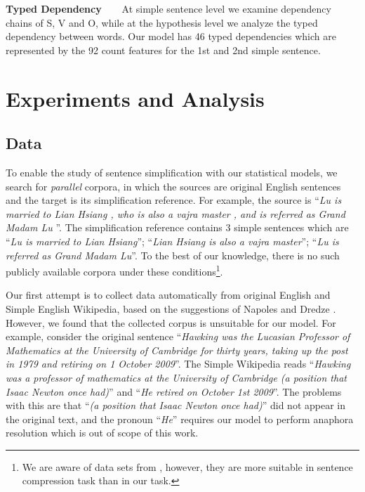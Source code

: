 \documentclass[10pt]{article}
\begin{document}
\textbf{Typed Dependency\ \ \ } At simple sentence level we examine dependency chains of S, V and O, while at the hypothesis level we analyze the typed dependency between words.
Our model has 46 typed dependencies which are represented by the 92 count features for the 1st and 2nd simple sentence.

\section{Experiments and Analysis}
\label{sec:Experiments}

\subsection{Data}

To enable the study of sentence simplification with our statistical models, we search for \textit{parallel} corpora, in which the sources are original English sentences and the target is its simplification reference.
For example, the source is ``\textit{Lu is married to Lian Hsiang , who is also a vajra master , and is referred as Grand Madam Lu }''.
The simplification reference contains 3 simple sentences which are ``\textit{Lu is married to Lian Hsiang}''; ``\textit{Lian Hsiang is also a vajra master}''; 
``\textit{Lu is referred as Grand Madam Lu}''. 
To the best of our knowledge, there is no such publicly available corpora under these conditions\footnote{We are aware of data sets from \cite{CohnLapata:2008,Zhu:2010}, however, they are more suitable in sentence compression task than in our task.}.

Our first attempt is to collect data automatically from original English and Simple English Wikipedia, based on the suggestions of Napoles and Dredze .
However, we found that the collected corpus is unsuitable for our model. 
For example, consider the original sentence ``\textit{Hawking was the Lucasian Professor of Mathematics at the University of Cambridge for thirty years, taking up the post in 1979 and retiring on 1 October 2009}''.
The Simple Wikipedia reads ``\textit{Hawking was a professor of mathematics at the University of Cambridge (a position that Isaac Newton once had)}'' and ``\textit{He retired on October 1st 2009}''.
The problems with this are that ``\textit{(a position that Isaac Newton once had)}'' did not appear in the original text, and the pronoun ``\textit{He}'' requires our model to perform anaphora resolution which is out of scope of this work.
\end{document}
